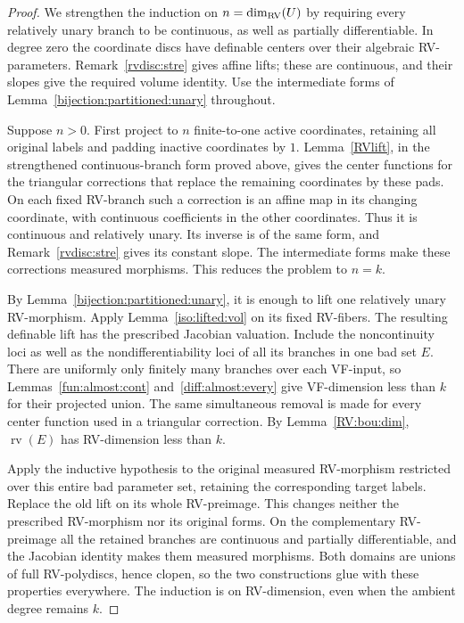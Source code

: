 \documentclass[12pt]{amsart}
\theoremstyle{plain}
\theoremstyle{definition}
\theoremstyle{remark}
\numberwithin{equation}{section}
\theoremstyle{plain}
\newcommand{\RV}{\textup{RV}}
\newcommand{\0}{\emptyset}
\DeclareMathOperator{\rv}{rv}
\begin{document}
\begin{proof}
We strengthen the induction on $n=\dim_{\RV}(U)$ by requiring every relatively unary branch to be continuous, as well as partially differentiable. In degree zero the coordinate discs have definable centers over their algebraic RV-parameters. Remark~\ref{rvdisc:stre} gives affine lifts; these are continuous, and their slopes give the required volume identity. Use the intermediate forms of Lemma~\ref{bijection:partitioned:unary} throughout.

Suppose $n>0$. First project to $n$ finite-to-one active coordinates, retaining all original labels and padding inactive coordinates by $1$. Lemma~\ref{RVlift}, in the strengthened continuous-branch form proved above, gives the center functions for the triangular corrections that replace the remaining coordinates by these pads. On each fixed RV-branch such a correction is an affine map in its changing coordinate, with continuous coefficients in the other coordinates. Thus it is continuous and relatively unary. Its inverse is of the same form, and Remark~\ref{rvdisc:stre} gives its constant slope. The intermediate forms make these corrections measured morphisms. This reduces the problem to $n=k$.

By Lemma~\ref{bijection:partitioned:unary}, it is enough to lift one relatively unary RV-morphism. Apply Lemma~\ref{iso:lifted:vol} on its fixed RV-fibers. The resulting definable lift has the prescribed Jacobian valuation. Include the noncontinuity loci as well as the nondifferentiability loci of all its branches in one bad set $E$. There are uniformly only finitely many branches over each VF-input, so Lemmas~\ref{fun:almost:cont} and~\ref{diff:almost:every} give VF-dimension less than $k$ for their projected union. The same simultaneous removal is made for every center function used in a triangular correction. By Lemma~\ref{RV:bou:dim}, $\rv(E)$ has RV-dimension less than $k$.

Apply the inductive hypothesis to the original measured RV-morphism restricted over this entire bad parameter set, retaining the corresponding target labels. Replace the old lift on its whole RV-preimage. This changes neither the prescribed RV-morphism nor its original forms. On the complementary RV-preimage all the retained branches are continuous and partially differentiable, and the Jacobian identity makes them measured morphisms. Both domains are unions of full RV-polydiscs, hence clopen, so the two constructions glue with these properties everywhere. The induction is on RV-dimension, even when the ambient degree remains $k$.


\end{proof}
\end{document}
